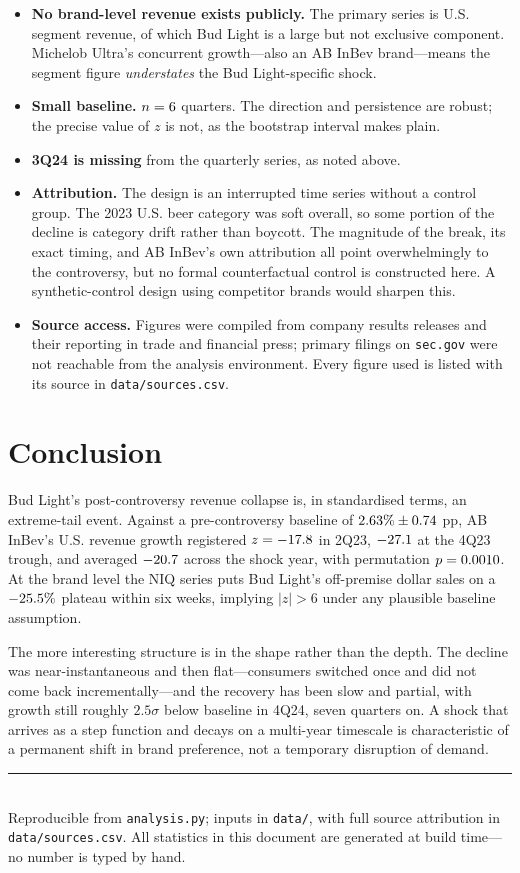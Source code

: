 \documentclass[11pt,a4paper]{article}
\begin{document}
\begin{itemize}[leftmargin=1.4em,itemsep=3pt]
\item \textbf{No brand-level revenue exists publicly.} The primary series is
  U.S. segment revenue, of which Bud Light is a large but not exclusive
  component. Michelob Ultra's concurrent growth---also an AB InBev brand---means
  the segment figure \emph{understates} the Bud Light-specific shock.
\item \textbf{Small baseline.} $n = 6$ quarters. The direction and
  persistence are robust; the precise value of $z$ is not, as the bootstrap
  interval makes plain.
\item \textbf{3Q24 is missing} from the quarterly series, as noted above.
\item \textbf{Attribution.} The design is an interrupted time series without a
  control group. The 2023 U.S. beer category was soft overall, so some portion
  of the decline is category drift rather than boycott. The magnitude of the
  break, its exact timing, and AB InBev's own attribution all point
  overwhelmingly to the controversy, but no formal counterfactual control is
  constructed here. A synthetic-control design using competitor brands would
  sharpen this.
\item \textbf{Source access.} Figures were compiled from company results
  releases and their reporting in trade and financial press; primary filings on
  \texttt{sec.gov} were not reachable from the analysis environment. Every
  figure used is listed with its source in \texttt{data/sources.csv}.
\end{itemize}

\section{Conclusion}

Bud Light's post-controversy revenue collapse is, in standardised terms, an
extreme-tail event. Against a pre-controversy baseline of
$2.63\% \pm 0.74$ pp, AB InBev's U.S. revenue growth registered
$z = -17.8$ in 2Q23, $-27.1$ at the 4Q23 trough, and averaged
$-20.7$ across the shock year, with permutation $p = 0.0010$. At the
brand level the NIQ series puts Bud Light's off-premise dollar sales on a
$-25.5\%$ plateau within six weeks, implying $|z| > 6$ under any
plausible baseline assumption.

The more interesting structure is in the shape rather than the depth. The
decline was near-instantaneous and then flat---consumers switched once and did
not come back incrementally---and the recovery has been slow and partial, with
growth still roughly $2.5\sigma$ below baseline in 4Q24, seven quarters on. A shock
that arrives as a step function and decays on a multi-year timescale is
characteristic of a permanent shift in brand preference, not a temporary
disruption of demand.

\vfill
\noindent\textcolor{rulegray}{\rule{\linewidth}{0.4pt}}\\[2pt]
{\footnotesize\color{rulegray}
Reproducible from \texttt{analysis.py}; inputs in \texttt{data/}, with full
source attribution in \texttt{data/sources.csv}. All statistics in this
document are generated at build time---no number is typed by hand.}
\end{document}
